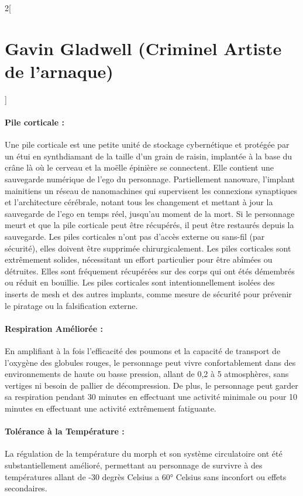 \documentclass[a4paper,9pt]{article}
\begin{document}
\begin{multicols}{2}[\section*{Gavin Gladwell (Criminel Artiste de l'arnaque)}]
   \paragraph{Pile corticale :}
   Une pile corticale est une petite unité de stockage cybernétique et protégée
   par un étui en synthdiamant de la taille d'un grain de raisin, implantée à la
   base du crâne là où le cerveau et la moëlle épinière se connectent. Elle
   contient une sauvegarde numérique de l'ego du personnage. Partiellement
   nanoware, l'implant mainitiens un réseau de nanomachines qui supervisent
   les connexions synaptiques et l'architecture cérébrale, notant tous les
   changement et mettant à jour la sauvegarde de l'ego en temps réel, jusqu'au
   moment de la mort. Si le personnage meurt et que la pile corticale peut être
   récupérés, il peut être restaurés depuis la sauvegarde. Les piles corticales
   n'ont pas d'accès externe ou sans-fil (par sécurité), elles doivent être
   supprimée chirurgicalement. Les piles corticales sont extrêmement solides,
   nécessitant un effort particulier pour être abîmées ou détruites. Elles sont
   fréquement récupérées sur des corps qui ont étés démembrés ou réduit en
   bouillie. Les piles corticales sont intentionnellement isolées des inserts de
   mesh et des autres implants, comme mesure de sécurité pour prévenir le piratage
   ou la falsification externe.

   \paragraph{Respiration Améliorée :} En amplifiant à la fois l'efficacité des
   poumons et la capacité de transport de l'oxygène des globules rouges, le
   personnage peut vivre confortablement dans des environnements de haute ou
   basse pression, allant de 0,2 à 5 atmosphères, sans vertiges ni besoin de
   pallier de décompression. De plus, le personnage peut garder sa respiration
   pendant 30 minutes en effectuant une activité minimale ou pour 10 minutes en
   effectuant une activité extrêmement fatiguante.

   \paragraph{Tolérance à la Température :} La régulation de la température du morph
   et son système circulatoire ont été substantiellement amélioré, permettant au
   personnage de survivre à des températures allant de -30 degrès Celsius a 60°
   Celsius sans inconfort ou effets secondaires.


\end{multicols}
\end{document}
